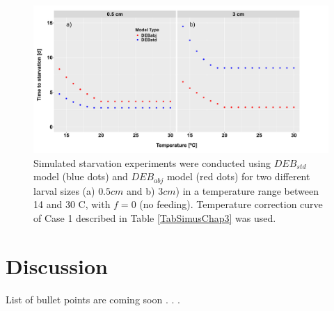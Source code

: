 \begin{figure}[ht]
	\includegraphics[width=1.0\textwidth]{figures/Chap4t_starvation_f0_V2cTcase1.png}
	\centering
	\caption{Simulated starvation experiments were conducted using $DEB_{std}$ model (blue dots) and $DEB_{abj}$ model (red dots) for two different larval sizes (a) $0.5 cm$ and b) $3 cm$) in a temperature range between 14 and 30 \textdegree C, with $f = 0$ (no feeding). Temperature correction curve of Case 1 described in Table \ref{TabSimusChap3} was used.}
	\label{Chap4t_starvation_f0_V2cTcase1}
\end{figure}

\section{Discussion}

List of bullet points are coming soon . . .
